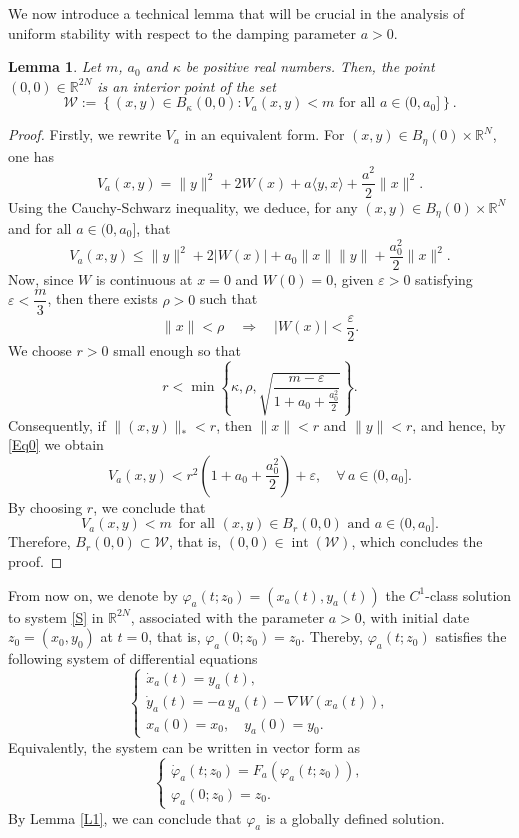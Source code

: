 \documentclass[12pt]{amsart}
\numberwithin{equation}{section}
\newtheorem{lemma}[theorem]{Lemma}
\begin{document}
We now introduce a technical lemma that will be crucial in the analysis of uniform stability with respect to the damping parameter $a>0$.

\begin{lemma}\label{L3}
Let $m$, $a_0$ and $\kappa$ be positive real numbers. Then, the point $ (0,0) \in \mathbb{R}^{2N} $ is an interior point of the set
$$
\mathcal{W} := \left\{ (x,y) \in B_\kappa(0,0) : V_a(x,y) < m \text{ for all } a \in (0, a_0] \right\}.
$$
\end{lemma}
\begin{proof}
Firstly, we rewrite $V_a$ in an equivalent form. For $(x,y) \in B_\eta(0)\times \mathbb{R}^N$, one has
$$
V_a(x,y) = \|y\|^2 + 2W(x) + a \langle y, x \rangle + \frac{a^2}{2}  \|x\|^2.
$$
Using the Cauchy-Schwarz inequality, we deduce, for any $(x,y) \in  B_\eta(0)\times \mathbb{R}^N$ and for all $a\in (0,a_0]$, that 
\begin{equation}\label{Eq0}
	V_a(x,y)\le \|y\|^2 + 2|W(x)| + a_0 \|x\| \|y\| + \frac{a_0^2}{2} \|x\|^2.
\end{equation}
Now, since $W$ is continuous at $x = 0$ and $W(0) = 0$, given $\varepsilon >0$ satisfying $\varepsilon<\dfrac{m}{3}$, then there exists $\rho>0$ such that 
$$
\|x\| < \rho \quad  \Rightarrow\quad  |W(x)| < \frac{\varepsilon}{2}.
$$
We choose $r > 0$ small enough so that	
$$
r < \min\left\{\kappa, \rho, \sqrt{ \frac{m - \varepsilon}{1 + a_0 + \frac{a_0^2}{2} } } \right\}.
$$
Consequently, if $\|(x,y)\|_* < r$, then $\|x\| < r$ and $\|y\| < r$, and hence, by \eqref{Eq0} we obtain
$$
V_a(x,y) < r^2 \left(1 + a_0 + \dfrac{a_0^2}{2}\right) + \varepsilon,\quad \forall \, a\in (0,a_0].
$$
By choosing $r$, we conclude that 	
$$
V_a(x,y)<m \, \text{ for all }  (x,y)\in B_r(0,0)\text{ and } a\in (0,a_0].
$$
Therefore, $B_r(0,0) \subset \mathcal{W}$, that is, $(0,0) \in \operatorname{int}(\mathcal{W})$, which concludes the proof.
\end{proof}

From now on, we denote by $\varphi_a(t;z_0) = (x_a(t), y_a(t))$ the $C^1$-class solution to system \eqref{S} in $\mathbb{R}^{2N}$, associated with the parameter $a > 0$, with initial date $z_0=(x_0,y_0)$ at $t=0$, that is, $\varphi_a(0;z_0)=z_0$. Thereby, $\varphi_a(t;z_0)$ satisfies the following system of differential equations
\begin{equation*}
	\left\{
	\begin{array}{lll} 
		\dot{x}_a(t) = y_a(t), \\[4pt]
		\dot{y}_a(t) = -a\, y_a(t) - \nabla W(x_a(t)),\\
		x_a(0)=x_0,\quad y_a(0)=y_0.
	\end{array}
	\right.
\end{equation*}
Equivalently, the system can be written in vector form as
\begin{equation}\label{SF}
		\left\{
	\begin{array}{ll} 
		\dot{\varphi}_a(t;z_0) = F_a(\varphi_a(t;z_0)), \\[4pt]
		\varphi_a(0;z_0)=z_0.
	\end{array}
	\right.
\end{equation}
By Lemma \ref{L1}, we can conclude that $\varphi_a$ is a globally defined solution.
\end{document}
